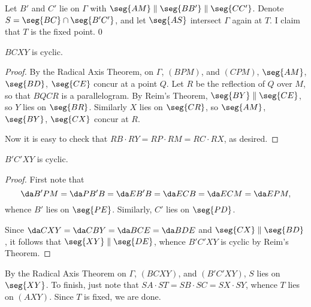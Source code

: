 Let $B'$ and $C'$ lie on $\Gamma$ with $\seg{AM}\parallel\seg{BB'}\parallel\seg{CC'}$. Denote $S=\seg{BC}\cap\seg{B'C'}$, and let $\seg{AS}$ intersect $\Gamma$ again at $T$. I claim that $T$ is the fixed point.
\setcounter{iclaim}0
\begin{iclaim}
    $BCXY$ is cyclic.
\end{iclaim}
\begin{proof}
    By the Radical Axis Theorem, on $\Gamma$, $(BPM)$, and $(CPM)$, $\seg{AM}$, $\seg{BD}$, $\seg{CE}$ concur at a point $Q$. Let $R$ be the reflection of $Q$ over $M$, so that $BQCR$ is a parallelogram. By Reim's Theorem, $\seg{BY}\parallel\seg{CE}$, so $Y$ lies on $\seg{BR}$. Similarly $X$ lies on $\seg{CR}$, so $\seg{AM}$, $\seg{BY}$, $\seg{CX}$ concur at $R$.

    Now it is easy to check that $RB\cdot RY=RP\cdot RM=RC\cdot RX$, as desired.
\end{proof}
\begin{iclaim}
    $B'C'XY$ is cyclic.
\end{iclaim}
\begin{proof}
    First note that \[\da B'PM=\da PB'B=\da EB'B=\da ECB=\da ECM=\da EPM,\]
    whence $B'$ lies on $\seg{PE}$. Similarly, $C'$ lies on $\seg{PD}$.

    Since $\da CXY=\da CBY=\da BCE=\da BDE$ and $\seg{CX}\parallel\seg{BD}$, it follows that $\seg{XY}\parallel\seg{DE}$, whence $B'C'XY$ is cyclic by Reim's Theorem.
\end{proof}

By the Radical Axis Theorem on $\Gamma$, $(BCXY)$, and $(B'C'XY)$, $S$ lies on $\seg{XY}$. To finish, just note that $SA\cdot ST=SB\cdot SC=SX\cdot SY$, whence $T$ lies on $(AXY)$. Since $T$ is fixed, we are done.

